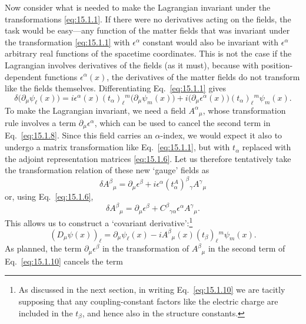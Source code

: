 Now consider what is needed to make the Lagrangian invariant under the
transformations \eqref{eq:15.1.1}. If there were no derivatives acting on the
fields, the task would be easy---any function of the matter fields that was
invariant under the transformation \eqref{eq:15.1.1} with $\epsilon^\alpha$
constant would also be invariant with $\epsilon^\alpha$ arbitrary real functions
of the spacetime coordinates. This is not the case if the Lagrangian involves
derivatives of the fields (as it must), because with position-dependent functions
$\epsilon^\alpha(x)$, the derivatives of the matter fields do not transform like
the fields themselves. Differentiating Eq.~\eqref{eq:15.1.1} gives
\begin{equation}
 \delta\bigl(\partial_\mu\psi_\ell(x)\bigr)
 =i\epsilon^\alpha(x)(t_\alpha)_\ell{}^m\bigl(\partial_\mu\psi_m(x)\bigr)
 +i\bigl(\partial_\mu\epsilon^\alpha(x)\bigr)(t_\alpha)_\ell{}^m\psi_m(x) .
 \tag{15.1.8}\label{eq:15.1.8}
\end{equation}
To make the Lagrangian invariant, we need a field $A^\alpha{}_\mu$, whose
transformation rule involves a term $\partial_\mu\epsilon^\alpha$, which can be
used to cancel the second term in Eq.~\eqref{eq:15.1.8}. Since this field carries
an $\alpha$-index, we would expect it also to undergo a matrix transformation
like Eq.~\eqref{eq:15.1.1}, but with $t_\alpha$ replaced with the adjoint
representation matrices \eqref{eq:15.1.6}. Let us therefore tentatively take the
transformation relation of these new `gauge' fields as
\[
 \delta A^\beta{}_\mu=\partial_\mu\epsilon^\beta
 +i\epsilon^\alpha(t^A_\alpha)^\beta{}_\gamma A^\gamma{}_\mu
\]
or, using Eq.~\eqref{eq:15.1.6},
\begin{equation}
 \delta A^\beta{}_\mu=\partial_\mu\epsilon^\beta
 +C^\beta{}_{\gamma\alpha}\epsilon^\alpha A^\gamma{}_\mu .
 \tag{15.1.9}\label{eq:15.1.9}
\end{equation}
This allows us to construct a `covariant derivative':\footnote{As discussed in
the next section, in writing Eq.~\eqref{eq:15.1.10} we are tacitly supposing that
any coupling-constant factors like the electric charge are included in the
$t_\beta$, and hence also in the structure constants.}
\begin{equation}
 (D_\mu\psi(x))_\ell=\partial_\mu\psi_\ell(x)
 -iA^\beta{}_\mu(x)(t_\beta)_\ell{}^m\psi_m(x) .
 \tag{15.1.10}\label{eq:15.1.10}
\end{equation}
As planned, the term $\partial_\mu\epsilon^\beta$ in the transformation of
$A^\beta{}_\mu$ in the second term of Eq.~\eqref{eq:15.1.10} cancels the term
